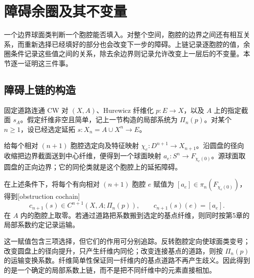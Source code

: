 
% 
% 

\section{障碍余圈及其不变量}
\label{g2:sec:1202}

一个边界球面类判断一个胞腔能否填入。对整个空间，胞腔的边界之间还有相互关系，而重新选择已经填好的部分也会改变下一步的障碍。上链记录逐胞腔的值，余圈条件记录这些值之间的关系，除去余边界则记录允许改变上一层后的不变量。本节逐一证明这三件事。

\subsection{障碍上链的构造}
\label{g2:subsec:1202:01}

固定道路连通 CW 对 \((X,A)\)、Hurewicz 纤维化 \(p:E\to X\)，以及 \(A\) 上的指定截面 \(s_A\)。假定纤维非空且简单，记上一节构造的局部系统为 \(\Pi_n(p)\)。对某个 \(n\ge1\)，设已经选定延拓 \(s:X_n=A\cup X^n\to E\)。

\ProseParagraphBreak

给每个相对 \((n+1)\) 胞腔选定向及特征映射 \(\chi_e:D^{n+1}\to X_{n+1}\)。沿圆盘的径向收缩把边界截面送到中心纤维，便得到一个球面映射 \(a_e:S^n\to F_{\chi_e(0)}\)。源球面取圆盘的正向边界；它的同伦类就是这个胞腔上的延拓障碍。

\begin{definition}[障碍上链]\label{g2:def:obstruction-cochain}
	在上述条件下，将每个有向相对 \((n+1)\) 胞腔 \(e\) 赋值为 \([a_e]\in\pi_n(F_{\chi_e(0)})\)，得到[obstruction cochain]
	\[
		c_{n+1}(s)\in C^{n+1}(X,A;\Pi_n(p)),\qquad c_{n+1}(s)(e)=[a_e].
	\]
	在 \(A\) 内的胞腔上取零。若通过道路把系数搬到选定的基点纤维，则同时按第5章的局部系数约定记录运输。
\end{definition}

这一赋值包含三项选择，但它们的作用可分别追踪。反转胞腔定向使球面类变号；改变圆盘上的径向提升，只产生纤维内同伦；改变连接基点的道路，则按 \(\Pi_n(p)\) 的运输变换系数。纤维简单性保证同一纤维内的基点道路不再产生歧义。因此得到的是一个确定的局部系数上链，而不是把不同纤维中的元素直接相加。

\ProseParagraphBreak

